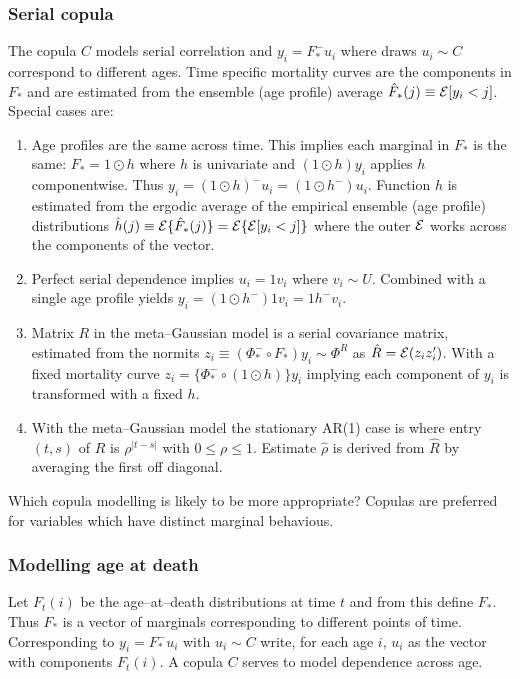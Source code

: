 \documentclass[a4paper,12pt]{article}
\newcommand{\Ex}{{\cal E}}
\begin{document}
    \subsubsection{Serial copula} The copula $C$ models serial correlation and $y_i=F_*^-u_i$ where draws $u_i\sim C$ correspond to different ages. Time specific mortality curves are the components in $F_*$ and are estimated from the ensemble (age profile) average $\hat F_*(j)\equiv\Ex[y_i<j]$.
Special cases are:
\begin{enumerate}
    \item Age profiles are the same across time.  This  implies each marginal in  $F_*$ is the same: $F_*=1\odot h$ where $h$ is univariate and $(1\odot h) y_i$ applies $h$ componentwise.  Thus $y_i=(1\odot h)^-u_i=(1\odot h^-)u_i$.  Function $h$ is estimated from the ergodic average of the empirical ensemble (age profile) distributions
$
\hat h(j)\equiv \Ex\{\hat F_*(j)\}=\Ex\{\Ex[y_i<j]\}
$ where the outer $\Ex$ works across the components of the vector.
    \item Perfect serial dependence implies $u_i=1v_i$ where $v_i\sim U$. Combined with a single age profile yields $y_i=(1\odot h^-)1v_i=1h^-v_i$.
    \item Matrix $R$ in the meta--Gaussian model is a serial covariance matrix, estimated from the normits $z_i\equiv(\Phi_*^-\circ F_*)y_i\sim \Phi^R$ as
$
\hat R = \Ex(z_iz_i')
$.
With a fixed mortality curve $z_i=\{\Phi_*^-\circ(1\odot h)\}y_i$ implying each component of $y_i$ is transformed with a fixed $h$.

\item    With the meta--Gaussian model the stationary AR(1) case  is where entry $(t,s)$ of $R$ is $\rho^{|t-s|}$ with $0\le\rho\le 1$.
Estimate $\hat\rho$ is derived from $\hat R$ by averaging the first off diagonal.
\end{enumerate}
Which copula modelling is likely to be more appropriate?  Copulas are preferred for variables which have distinct marginal behavious.

\subsubsection{Modelling age at death}

Let $F_t(i)$ be the age--at--death distributions at time $t$ and from this define $F_*$.  Thus $F_*$ is a vector of marginals corresponding to different points of time.  Corresponding to $y_i=F_*^-u_i$ with $u_i\sim C$ write, for each age $i$,  $u_i$ as the vector with components $F_t(i)$.  A copula $C$ serves to model dependence across age.
\end{document}
